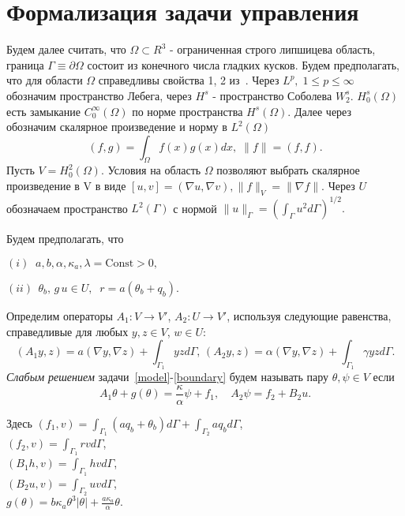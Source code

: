 \section{Формализация задачи управления}\label{sec:formalization}
Будем далее считать, что $\Omega \subset R^3$ - ограниченная строго липшицева область,
граница $\Gamma \equiv \partial \Omega$ состоит из конечного числа гладких кусков.
Будем предполагать, что для области $\Omega$ справедливы свойства 1, 2 из~\cite{}.
Через $L^p, \; 1 \leq p \leq \infty$ обозначим пространство Лебега, через $H^s$ - пространство Соболева $W^s_2$.
$H^s_0(\Omega)$ есть замыкание $C^\infty_0(\Omega)$ по норме пространства $H^s(\Omega)$.
Далее через обозначим скалярное произведение и норму в $L^2(\Omega)$
\[
    (f, g) = \int_\Omega f(x)g(x)dx, \; \| f \| = (f, f).
\]
Пусть $V = H^2_0(\Omega)$.
Условия на область $\Omega$ позволяют выбрать скалярное произведение в V в виде
$[u, v] = (\nabla u, \nabla v), \| f \|_V = \| \nabla f \|$.
Через $U$ обозначаем пространство $L^2(\Gamma)$ с нормой
$\|u\|_\Gamma=\left(\int_\Gamma u^2 d\Gamma\right)^{1/2}.$

Будем предполагать, что

$(i) \;\; a,b,\alpha,\kappa_a, \lambda =\textrm{Const} > 0 ,$

$(ii) \;\, \theta_b, \,g \, u \in U,\;\; r=a(\theta_b+q_b).$


Определим операторы $A_1\colon V \to V'$, $A_2\colon U \to V'$, используя
следующие равенства, справедливые для любых $y,z \in V$, $w\in U$:
\[
    (A_1 y,z) = a(\nabla y, \nabla z) + \int_{\Gamma_1} yz d\Gamma, \,
    (A_2 y, z) = \alpha (\nabla y, \nabla z) + \int_{\Gamma_1} \gamma yz d\Gamma.
\]
    {\it Слабым решением} задачи~\eqref{model}-\eqref{boundary} будем называть
пару $\theta, \psi \in V$ если
\begin{equation}
    \label{weak}
    A_1\theta  + g(\theta) = \frac{\kappa}{\alpha} \psi + f_1, \quad
    A_2\psi = f_2 + B_2 u.
\end{equation}

Здесь
$(f_1, v) = \int_{\Gamma_1} (a q_b + \theta_b)d\Gamma + \int_{\Gamma_2} a q_b d\Gamma$,\\
$(f_2, v) = \int_{\Gamma_1} r v d\Gamma$,\\
$(B_1 h,v) = \int_{\Gamma_1} h v d\Gamma$,\\
$(B_2 u, v) = \int_{\Gamma_2} u v d\Gamma$,\\
$g(\theta) = b\kappa_a \theta^3 |\theta| + \frac{a\kappa_a}{\alpha}\theta.$


